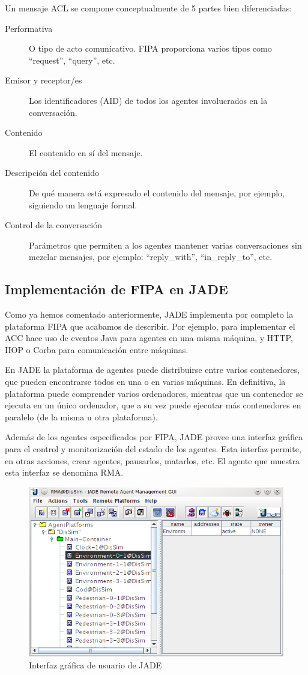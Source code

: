 Un mensaje ACL se compone conceptualmente de 5 partes bien diferenciadas:

\begin{description}
 \item[Performativa] O tipo de acto comunicativo. FIPA proporciona varios tipos
 como ``request'', ``query'', etc.
 \item[Emisor y receptor/es] Los identificadores (AID) de todos los agentes
 involucrados en la conversación.
 \item[Contenido] El contenido en sí del mensaje.
 \item[Descripción del contenido] De qué manera está expresado el contenido del
 mensaje, por ejemplo, siguiendo un lenguaje formal.
 \item[Control de la conversación] Parámetros que permiten a los agentes
 mantener varias conversaciones sin mezclar mensajes, por ejemplo:
 ``reply\_with'', ``in\_reply\_to'', etc.
\end{description}

\subsection{Implementación de FIPA en JADE}

Como ya hemos comentado anteriormente, JADE implementa por completo la
plataforma FIPA que acabamos de describir\cite{Corral06}. Por ejemplo, para
implementar el ACC hace uso de eventos Java para agentes en una misma máquina, y
HTTP, IIOP o Corba para comunicación entre máquinas.

En JADE la plataforma de agentes puede distribuirse entre varios contenedores,
que pueden encontrarse todos en una o en varias máquinas. En definitiva, la
plataforma puede comprender varios ordenadores, mientras que un contenedor se
ejecuta en un único ordenador, que a su vez puede ejecutar más contenedores en
paralelo (de la misma u otra plataforma).

Además de los agentes especificados por FIPA, JADE provee una interfaz gráfica
para el control y monitorización del estado de los agentes. Esta interfaz
permite, en otras acciones, crear agentes, pausarlos, matarlos, etc. El agente
que muestra esta interfaz se denomina RMA.

\begin{figure}[H]
 \centering
 \includegraphics[width=120mm]{figuras/cap4/rma.png}
 \caption{Interfaz gráfica de usuario de JADE}
\end{figure}


